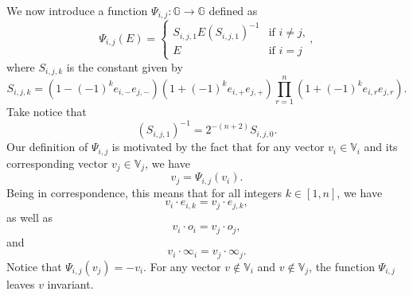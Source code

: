 \documentclass{ecgd-l}
\theoremstyle{definition}
\theoremstyle{remark}
\numberwithin{equation}{section}
\newcommand{\G}{\mathbb{G}}
\newcommand{\V}{\mathbb{V}}
\newcommand{\nvai}{\infty}
\newcommand{\nvao}{o}
\begin{document}
We now introduce a function $\Psi_{i,j}:\G\to\G$ defined as
\begin{equation*}
\Psi_{i,j}(E) = \left\{\begin{array}{ll}
S_{i,j,1}E(S_{i,j,1})^{-1} & \mbox{if $i\neq j$,} \\
E & \mbox{if $i=j$}\end{array}\right.,
\end{equation*}
where $S_{i,j,k}$ is the constant given by
\begin{equation}\label{equ_S}
S_{i,j,k} = \left(1-(-1)^ke_{i,-}e_{j,-}\right)\left(1+(-1)^ke_{i,+}e_{j,+}\right)\prod_{r=1}^n\left(1+(-1)^ke_{i,r}e_{j,r}\right).
\end{equation}
Take notice that
\begin{equation*}
(S_{i,j,1})^{-1} = 2^{-(n+2)}S_{i,j,0}.
\end{equation*}
Our definition of $\Psi_{i,j}$ is motivated by the fact that for any vector $v_i\in\V_i$ and its
corresponding vector $v_j\in\V_j$, we have
\begin{equation*}
v_j = \Psi_{i,j}(v_i).
\end{equation*}
Being in correspondence, this means that for all integers $k\in[1,n]$,
we have
\begin{equation*}
v_i\cdot e_{i,k}=v_j\cdot e_{j,k},
\end{equation*}
as well as
\begin{equation*}
v_i\cdot\nvao_i = v_j\cdot\nvao_j,
\end{equation*}
and
\begin{equation*}
v_i\cdot\nvai_i = v_j\cdot\nvai_j.
\end{equation*}
Notice that $\Psi_{i,j}(v_j)=-v_i$.
For any vector $v\not\in\V_i$ and $v\not\in\V_j$, the function $\Psi_{i,j}$ leaves $v$ invariant.
\end{document}
